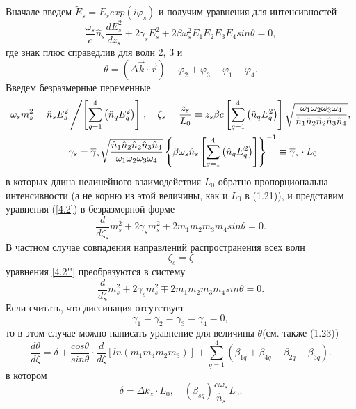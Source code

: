 \documentclass[a4paper]{article}
\begin{document}
	Вначале введем $\tilde{E}_{s}=E_{s}exp(i\varphi_{s})$ и получим уравнения для интенсивностей 
	\begin{equation}
		\frac{\omega_{s}}{c}\hat{n}_{s}\frac{dE_{s}^{2}}{dz_{s}}+2\overline{\gamma}_{s}E_{s}^{2}\mp2\beta\omega_{s}^{2}E_{1}E_{2}E_{3}E_{4}sin\theta=0,\label{4.2}
	\end{equation}
	где знак плюс  справедлив для волн 2, 3 и  
	\begin{equation}
		\theta=(\Delta\vec{k}\cdot\vec{r})+\varphi_{2}+\varphi_{3}-\varphi_{1}-\varphi_{4}.
		\label{4.2'}\tag{4'}
	\end{equation}
	Введем безразмерные переменные 
	\begin{equation}
		\begin{aligned}
		\omega_{s}m_{s}^{2}=\hat{n}_{s}E_{s}^{2}&\left/\left[\sum_{q=1}^{4}\left(\hat{n}_{q}E_{q}^{2}\right)\right]\right.,\quad\zeta_{s}=\frac{z_{s}}{L_{0}}\equiv z_{s}\beta c\left[\sum_{q=1}^{4}\left(\hat{n}_{q}E_{q}^{2}\right)\right]\sqrt{\frac{\omega_{1}\omega_{2}\omega_{3}\omega_{4}}{\hat{n}_{1}\hat{n}_{2}\hat{n}_{2}\hat{n}_{3}\hat{n}_{4}}},\\
		&\gamma_{s}=\overline{\gamma}_{s}\sqrt{\frac{\hat{n}_{1}\hat{n}_{2}\hat{n}_{2}\hat{n}_{3}\hat{n}_{4}}{\omega_{1}\omega_{2}\omega_{3}\omega_{4}}}\left\{\beta\omega_{s}\hat{n}_{s}\left[\sum_{q=1}^{4}\left(\hat{n}_{q}E_{q}^{2}\right)\right]\right\}^{-1}\equiv\overline{\gamma}_{s}\cdot L_{0}
		\end{aligned}\label{5.2}
	\end{equation}
	в которых длина нелинейного взаимодействия $L_{0}$ обратно пропорциональна интенсивности (а не корню из этой величины, как и $L_{0}$ в (1.21)), и представим уравнения (\eqref{4.2}) в безразмерной форме   
	\begin{equation}
		\frac{d}{d\zeta_{s}}m_{s}^{2}+2\gamma_{s}m_{s}^{2}\mp2m_{1}m_{2}m_{3}m_{4}sin\theta=0.
		\label{4.2''}\tag{4''}
	\end{equation}
	В частном случае совпадения направлений распространения всех волн 
	\begin{equation}
		\zeta_{s}=\zeta
		\label{6.2}
	\end{equation}
	уравнения \eqref{4.2''} преобразуются в систему 
	\begin{equation}
		\frac{d}{d\zeta}m_{s}^{2}+2\gamma_{s}m_{s}^{2}\mp2m_{1}m_{2}m_{3}m_{4}sin\theta=0.
		\label{7.2.2}
	\end{equation}
	Если считать, что диссипация отсутствует  
	\begin{equation}
		\overline{\gamma}_{1}=\overline{\gamma}_{2}=\overline{\gamma}_{3}=\overline{\gamma}_{4}=0,\label{8.2}
	\end{equation}
	то в этом случае можно написать уравнение для величины $\theta$(см. также (1.23))
	\begin{equation}
		\frac{d\theta}{d\zeta}=\delta+\frac{cos\theta}{sin\theta}\cdot\frac{d}{d\zeta}[ln(m_{1}m_{4}m_{2}m_{3})]+\sum_{q=1}^{4}(\beta_{1q}+\beta_{4q}-\beta_{2q}-\beta_{3q}).
		\label{9.2}
	\end{equation}
	в котором $$\delta=\Delta k_{z}\cdot L_{0},\quad(\beta_{sq})\frac{c\omega_{s}}{\hat{n}_{s}}L_{0}.$$
	
\end{document}
